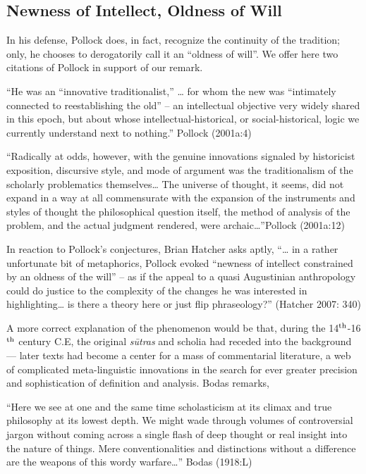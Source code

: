 \subsection{Newness of Intellect, Oldness of Will}%

In his defense, Pollock does, in fact, recognize the continuity of the tradition; only, he chooses to derogatorily call it an “oldness of will”. We offer here two citations of Pollock in support of our remark.
\begin{myquote}
“He was an “innovative traditionalist,” … for whom the new was “intimately connected to reestablishing the old” – an intellectual objective very widely shared in this epoch, but about whose intellectual-historical, or social-historical, logic we currently understand next to nothing.” \hfill{Pollock (2001a:4)}

“Radically at odds, however, with the genuine innovations signaled by historicist exposition, discursive style, and mode of argument was the traditionalism of the scholarly problematics themselves… The universe of thought, it seems, did not expand in a way at all commensurate with the expansion of the instruments and styles of thought the philosophical question itself, the method of analysis of the problem, and the actual judgment rendered, were archaic…”\hfill{Pollock (2001a:12)}
\end{myquote}
In reaction to Pollock’s conjectures, Brian Hatcher asks aptly, “… in a rather unfortunate bit of metaphorics, Pollock evoked “newness of intellect constrained by an oldness of the will” – as if the appeal to a quasi Augustinian anthropology could do justice to the complexity of the changes he was interested in highlighting… is there a theory here or just flip phraseology?” (Hatcher 2007: 340) 

A more correct explanation of the phenomenon would be that, during the 14$^{\rm th}$-16$^{\rm th}$ century C.E, the original {\sl sūtras} and scholia had receded into the background — later texts had become a center for a mass of commentarial literature, a web of complicated meta-linguistic innovations in the search for ever greater precision and sophistication of definition and analysis. Bodas remarks,
\begin{myquote}
“Here we see at one and the same time scholasticism at its climax and true philosophy at its lowest depth. We might wade through volumes of controversial jargon without coming across a single flash of deep thought or real insight into the nature of things. Mere conventionalities and distinctions without a difference are the weapons of this wordy warfare…” \hfill{Bodas (1918:L)}
\end{myquote}

